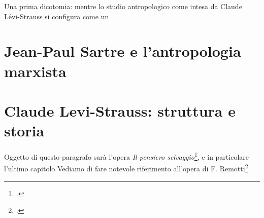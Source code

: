 Una prima dicotomia: mentre lo studio antropologico come intesa da Claude L\'evi-Strauss si configura come un 

\section{Jean-Paul Sartre e l'antropologia marxista}



\section{Claude Levi-Strauss: struttura e storia}
Oggetto di questo paragrafo sarà l'opera \textit{Il pensiero selvaggio}\footnote{\cite{levi2010pensiero}.}, e in particolare l'ultimo capitolo 
Vediamo di fare notevole riferimento all'opera di F. Remotti\footnote{\cite{remotti1971levi}.}